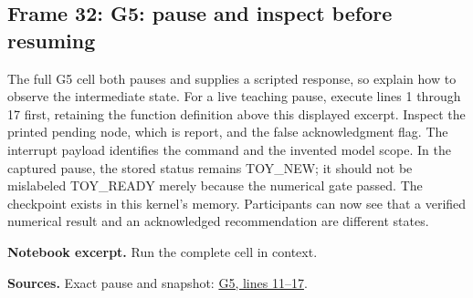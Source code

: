 \documentclass[11pt]{article}
\begin{document}
\subsection*{Frame 32: G5: pause and inspect before resuming}
The full G5 cell both pauses and supplies a scripted response, so explain how to observe the intermediate state. For a live teaching pause, execute lines 1 through 17 first, retaining the function definition above this displayed excerpt. Inspect the printed pending node, which is report, and the false acknowledgment flag. The interrupt payload identifies the command and the invented model scope. In the captured pause, the stored status remains TOY\_NEW; it should not be mislabeled TOY\_READY merely because the numerical gate passed. The checkpoint exists in this kernel's memory. Participants can now see that a verified numerical result and an acknowledged recommendation are different states.\par
\par\noindent\begin{minipage}{\linewidth}\textbf{Notebook excerpt.} Run the complete cell in context.\par \end{minipage}\par
\par\nopagebreak\begin{minipage}{\linewidth}{\footnotesize\color{slate}\textbf{Sources.} Exact pause and snapshot: \href{../Graph_Workflow_Lab.ipynb}{G5, lines 11--17}.\par}\end{minipage}\par\medskip
\end{document}
